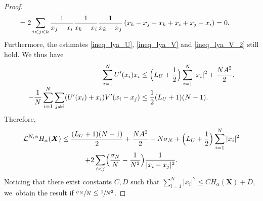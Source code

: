 \documentclass[JEP,XML,SOM,Unicode,published]{cedram}
\newcommand{\bX}{{\boldsymbol{X}}}
\theoremstyle{plain}
\theoremstyle{definition}
\begin{document}
\begin{proof}
\begin{align*}
&\hspace*{-.4cm}=2\sum_{i<j<k}\frac{1}{x_j-x_i}\frac{1}{x_k-x_i}\frac{1}{x_k-x_j}\left(x_k-x_j-x_k+x_i+x_j-x_i\right)=0.
\end{align*}
Furthermore, the estimates \eqref{ineq_lya_U}, \eqref{ineq_lya_V} and \eqref{ineq_lya_V_2} still hold. We thus have
\begin{align*}
-\sum_{i=1}^N U'(x_i)x_i&\leq\Bigl(L_U+\frac{1}{2}\Bigr)\sum_{i=1}^N|x_i|^2+\frac{NA^2}{2},\\[-3pt]
-\frac{1}{N}\sum_{i=1}^N\sum_{j\neq i}(U'(x_i)+x_i)V'(x_i-x_j)&\leq \frac{1}{2}(L_U+1)(N-1).
\end{align*}
Therefore,
\begin{multline*}
\mathcal{L}^{N,\alpha} H_\alpha(\bX)\leq \frac{(L_U+1)(N-1)}{2}+\frac{NA^2}{2}+N\sigma_N+\Bigl(L_U+\frac{1}{2}\Bigr)\sum_{i=1}^N|x_i|^2\\
+2\sum_{i<j}\Bigl(\frac{\sigma_N}{N}-\frac{1}{N^2}\Bigr)\frac{1}{|x_i-x_j|^2}.
\end{multline*}
Noticing that there exist constants $C,D$ such that $\sum_{i=1}^N|x_i|^2\leq CH_{\alpha}(\bX)+D$, we~obtain the result if $\sfrac{\sigma_N}{N}\leq\sfrac{1}{N^2}$.
\end{proof}
\end{document}
